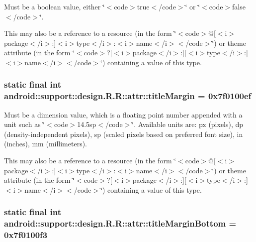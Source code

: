 Must be a boolean value, either \char`\"{}$<$code$>$true$<$/code$>$\char`\"{} or \char`\"{}$<$code$>$false$<$/code$>$\char`\"{}. 

This may also be a reference to a resource (in the form \char`\"{}$<$code$>$@\mbox{[}$<$i$>$package$<$/i$>$:\mbox{]}$<$i$>$type$<$/i$>$:$<$i$>$name$<$/i$>$$<$/code$>$\char`\"{}) or theme attribute (in the form \char`\"{}$<$code$>$?\mbox{[}$<$i$>$package$<$/i$>$:\mbox{]}\mbox{[}$<$i$>$type$<$/i$>$:\mbox{]}$<$i$>$name$<$/i$>$$<$/code$>$\char`\"{}) containing a value of this type. \hypertarget{classandroid_1_1support_1_1design_1_1_r_1_1attr_eba63f4dc6fa70d8b094677693c26649}{
\subsubsection[{titleMargin}]{\setlength{\rightskip}{0pt plus 5cm}static final int android::support::design.R.R::attr::titleMargin = 0x7f0100ef}}
\label{classandroid_1_1support_1_1design_1_1_r_1_1attr_eba63f4dc6fa70d8b094677693c26649}


Must be a dimension value, which is a floating point number appended with a unit such as \char`\"{}$<$code$>$14.5sp$<$/code$>$\char`\"{}. Available units are: px (pixels), dp (density-independent pixels), sp (scaled pixels based on preferred font size), in (inches), mm (millimeters). 

This may also be a reference to a resource (in the form \char`\"{}$<$code$>$@\mbox{[}$<$i$>$package$<$/i$>$:\mbox{]}$<$i$>$type$<$/i$>$:$<$i$>$name$<$/i$>$$<$/code$>$\char`\"{}) or theme attribute (in the form \char`\"{}$<$code$>$?\mbox{[}$<$i$>$package$<$/i$>$:\mbox{]}\mbox{[}$<$i$>$type$<$/i$>$:\mbox{]}$<$i$>$name$<$/i$>$$<$/code$>$\char`\"{}) containing a value of this type. \hypertarget{classandroid_1_1support_1_1design_1_1_r_1_1attr_49851d7dde5edcb9a4732afd1e84a42c}{
\subsubsection[{titleMarginBottom}]{\setlength{\rightskip}{0pt plus 5cm}static final int android::support::design.R.R::attr::titleMarginBottom = 0x7f0100f3}}
\label{classandroid_1_1support_1_1design_1_1_r_1_1attr_49851d7dde5edcb9a4732afd1e84a42c}


